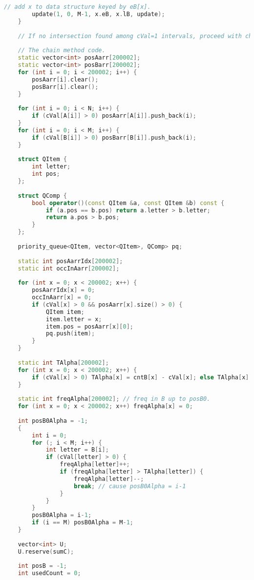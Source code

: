 \begin{lstlisting}[language=C++]
        // add x to data structure keyed by eB[x].
        update(1, 0, M-1, x.eB, x.lB, update);
    }
 
    // If no intersection found among cVal=1 intervals, proceed with chain method.
 
    // The chain method code.
    static vector<int> posAarr[200002];
    static vector<int> posBarr[200002];
    for (int i = 0; i < 200002; i++) {
        posAarr[i].clear();
        posBarr[i].clear();
    }
 
    for (int i = 0; i < N; i++) {
        if (cVal[A[i]] > 0) posAarr[A[i]].push_back(i);
    }
    for (int i = 0; i < M; i++) {
        if (cVal[B[i]] > 0) posBarr[B[i]].push_back(i);
    }
 
    struct QItem {
        int letter;
        int pos;
    };
 
    struct QComp {
        bool operator()(const QItem &a, const QItem &b) const {
            if (a.pos == b.pos) return a.letter > b.letter;
            return a.pos > b.pos;
        }
    };
 
    priority_queue<QItem, vector<QItem>, QComp> pq;
 
    static int posAarrIdx[200002];
    static int occInAarr[200002];
 
    for (int x = 0; x < 200002; x++) {
        posAarrIdx[x] = 0;
        occInAarr[x] = 0;
        if (cVal[x] > 0 && posAarr[x].size() > 0) {
            QItem item;
            item.letter = x;
            item.pos = posAarr[x][0];
            pq.push(item);
        }
    }
 
    static int TAlpha[200002];
    for (int x = 0; x < 200002; x++) {
        if (cVal[x] > 0) TAlpha[x] = cntB[x] - cVal[x]; else TAlpha[x] = 0;
    }
 
    static int freqAlpha[200002]; // freq in B up to posB0.
    for (int x = 0; x < 200002; x++) freqAlpha[x] = 0;
 
    int posB0Alpha = -1;
    {
        int i = 0;
        for (; i < M; i++) {
            int letter = B[i];
            if (cVal[letter] > 0) {
                freqAlpha[letter]++;
                if (freqAlpha[letter] > TAlpha[letter]) {
                    freqAlpha[letter]--;
                    break; // cause posB0Alpha = i-1
                }
            }
        }
        posB0Alpha = i-1;
        if (i == M) posB0Alpha = M-1;
    }
 
    vector<int> U;
    U.reserve(sumC);
 
    int posB = -1;
    int usedCount = 0;
 

\end{lstlisting}
